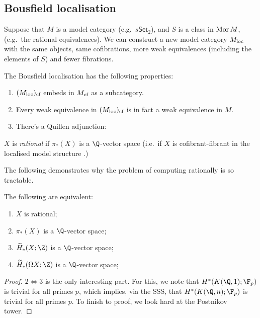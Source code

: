 \documentclass[11pt]{article}
\begin{document}
\begin{Jeremy RationalHomotopyPractice}
\subsection*{Bousfield localisation}
Suppose that $M$ is a model category (e.g.\ $s\mathsf{Set}_2$), and $S$ is a class in $\operatorname{Mor} M$, (e.g.\ the rational equivalences). We can construct a new model category $M_{\textup{loc}}$ with the same objects, same cofibrations, more weak equivalences (including the elements of $S$) and fewer fibrations. 
\begin{prop*}
The Bousfield localisation has the following properties:
\begin{enumerate}\squishlist
\item $(M_{\textup{loc}})_{\textup{cf}}$ embeds in $M_{\textup{cf}}$ as a subcategory.
\item Every weak equivalence in  $(M_{\textup{loc}})_{\textup{cf}}$ is in fact a weak equivalence in $M$.
\item There's a Quillen adjunction:
\end{enumerate}
\end{prop*}
\begin{defn*}
$X$ is \emph{rational} if $\pi_*(X)$ is a $\Q$-vector space (i.e.\ if $X$ is cofibrant-fibrant in the localised model structure .)
\end{defn*}
The following demonstrates why the problem of computing rationally is so tractable.
\begin{thm*}
The following are equivalent:
\begin{enumerate}\squishlist
\item $X$ is rational;
\item $\pi_*(X)$ is a $\Q$-vector space;
\item $\widetilde{H}_{*}(X;\Z)$ is a $\Q$-vector space;
\item $\widetilde{H}_{*}(\Omega X;\Z)$ is a $\Q$-vector space;
\end{enumerate}
\end{thm*}
\begin{proof}
$2\iff 3$ is the only interesting part. For this, we note that ${H}^{*}(K(\Q,1);\F_p)$ is trivial for all primes $p$, which implies, via the SSS, that ${H}^{*}(K(\Q,n);\F_p)$ is trivial for all primes $p$. To finish to proof, we look hard at the Postnikov tower.

\end{proof}
\end{Jeremy RationalHomotopyPractice}
\end{document}
